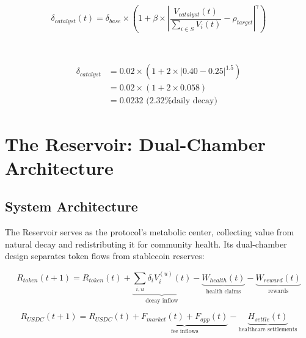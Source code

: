 \documentclass[11pt,letterpaper]{article}
\begin{document}
~


\begin{equation}
\delta_{catalyst}(t) = \delta_{base} \times \left(1 + \beta \times \left|\frac{V_{catalyst}(t)}{\sum_{i \in S} V_i(t)} - \rho_{target}\right|^{\gamma}\right)
\end{equation}


~

\begin{align}
\delta_{catalyst} &= 0.02 \times \left(1 + 2 \times |0.40 - 0.25|^{1.5}\right) \\
&= 0.02 \times (1 + 2 \times 0.058) \\
&= 0.0232 \text{ (2.32\% daily decay)}
\end{align}


\section{The Reservoir: Dual-Chamber Architecture}

\subsection{System Architecture}

The Reservoir serves as the protocol's metabolic center, collecting value from natural decay and redistributing it for community health. Its dual-chamber design separates token flows from stablecoin reserves:

\begin{equation}
R_{token}(t+1) = R_{token}(t) + \underbrace{\sum_{i,u} \delta_i V_i^{(u)}(t)}_{\text{decay inflow}} - \underbrace{W_{health}(t)}_{\text{health claims}} - \underbrace{W_{reward}(t)}_{\text{rewards}}
\end{equation}

\begin{equation}
R_{USDC}(t+1) = R_{USDC}(t) + \underbrace{F_{market}(t) + F_{app}(t)}_{\text{fee inflows}} - \underbrace{H_{settle}(t)}_{\text{healthcare settlements}}
\end{equation}
\end{document}
